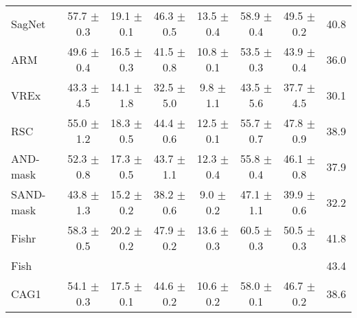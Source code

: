 \documentclass{article}
\begin{document}
\begin{center}
{\begin{tabular}{lccccccc}
SagNet               & 57.7 $\pm$ 0.3       & 19.1 $\pm$ 0.1       & 46.3 $\pm$ 0.5       & 13.5 $\pm$ 0.4       & 58.9 $\pm$ 0.4       & 49.5 $\pm$ 0.2       & 40.8                 \\
ARM                  & 49.6 $\pm$ 0.4       & 16.5 $\pm$ 0.3       & 41.5 $\pm$ 0.8       & 10.8 $\pm$ 0.1       & 53.5 $\pm$ 0.3       & 43.9 $\pm$ 0.4       & 36.0                 \\
VREx                 & 43.3 $\pm$ 4.5       & 14.1 $\pm$ 1.8       & 32.5 $\pm$ 5.0       & 9.8 $\pm$ 1.1        & 43.5 $\pm$ 5.6       & 37.7 $\pm$ 4.5       & 30.1                 \\
RSC                  & 55.0 $\pm$ 1.2       & 18.3 $\pm$ 0.5       & 44.4 $\pm$ 0.6       & 12.5 $\pm$ 0.1       & 55.7 $\pm$ 0.7       & 47.8 $\pm$ 0.9       & 38.9                 \\
AND-mask             & 52.3 $\pm$ 0.8       & 17.3 $\pm$ 0.5       & 43.7 $\pm$ 1.1       & 12.3 $\pm$ 0.4       & 55.8 $\pm$ 0.4       & 46.1 $\pm$ 0.8       & 37.9                 \\
SAND-mask            & 43.8 $\pm$ 1.3       & 15.2 $\pm$ 0.2       & 38.2 $\pm$ 0.6       & 9.0 $\pm$ 0.2        & 47.1 $\pm$ 1.1       & 39.9 $\pm$ 0.6       & 32.2                 \\
Fishr                & 58.3 $\pm$ 0.5       & 20.2 $\pm$ 0.2       & 47.9 $\pm$ 0.2       & 13.6 $\pm$ 0.3       & 60.5 $\pm$ 0.3       & 50.5 $\pm$ 0.3       & 41.8                 \\
Fish                 &                      &                      &                      &                      &                      &                      & 43.4                 \\ 
\midrule
CAG1                 & 54.1 $\pm$ 0.3       & 17.5 $\pm$ 0.1       & 44.6 $\pm$ 0.2       & 10.6 $\pm$ 0.2       & 58.0 $\pm$ 0.1       & 46.7 $\pm$ 0.2       & 38.6                 \\
\bottomrule
\end{tabular}}
\end{center}
\end{document}

